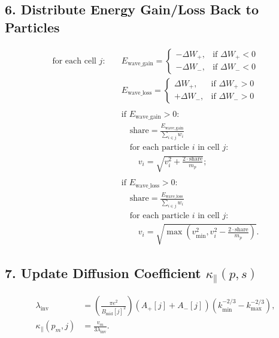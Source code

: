 \subsection*{6. Distribute Energy Gain/Loss Back to Particles}

\[
\begin{aligned}
\text{for each cell } j: \quad
& E_{\text{wave\_gain}} =
\begin{cases}
-\Delta W_{+}, & \text{if } \Delta W_{+} < 0 \\
-\Delta W_{-}, & \text{if } \Delta W_{-} < 0
\end{cases} \\
& E_{\text{wave\_loss}} =
\begin{cases}
\Delta W_{+}, & \text{if } \Delta W_{+} > 0 \\
+\Delta W_{-}, & \text{if } \Delta W_{-} > 0
\end{cases} \\
\\
& \text{if } E_{\text{wave\_gain}} > 0: \\
& \quad \text{share} = \frac{E_{\text{wave\_gain}}}{\sum_{i \in j} w_i} \\
& \quad \text{for each particle } i \text{ in cell } j: \\
& \quad\quad v_i = \sqrt{v_i^2 + \frac{2 \cdot \text{share}}{m_p}}; \\
\\
& \text{if } E_{\text{wave\_loss}} > 0: \\
& \quad \text{share} = \frac{E_{\text{wave\_loss}}}{\sum_{i \in j} w_i} \\
& \quad \text{for each particle } i \text{ in cell } j: \\
& \quad\quad v_i = \sqrt{ \max\left( v_{\min}^2, v_i^2 - \frac{2 \cdot \text{share}}{m_p} \right) }.
\end{aligned}
\]


\subsection*{7. Update Diffusion Coefficient $\kappa_\parallel(p,s)$}

\[
\begin{aligned}
\lambda_{\text{inv}} &= \left( \frac{\pi e^2}{B_{\text{mid}}[j]^2} \right) \left( A_{+}[j] + A_{-}[j] \right) \left( k_{\min}^{-2/3} - k_{\max}^{-2/3} \right), \\
\kappa_\parallel(p_m, j) &= \frac{v_m}{3 \lambda_{\text{inv}}}.
\end{aligned}
\]

